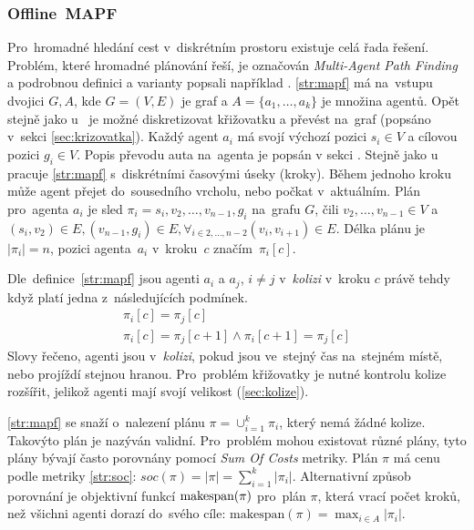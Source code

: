 \subsubsection{Offline~MAPF}\label{subsubsec:offline_mapf}

%

Pro~hromadné hledání cest v~diskrétním prostoru existuje celá řada řešení.
Problém, které hromadné plánování řeší, je označován \emph{Multi-Agent Path Finding} 
a podrobnou definici a varianty popsali například \citet{osti_10114869}.
\ref{str:mapf} má na~vstupu dvojici $G, A$, kde $G=(V, E)$ je graf a $A = \{a_1, \dots, a_k\}$ je množina agentů.
Opět stejně jako u~ je možné diskretizovat křižovatku
a převést na~graf (popsáno v~sekci \ref{sec:krizovatka}).
Každý agent $a_i$ má svojí výchozí pozici $s_i \in V$ a cílovou pozici $g_i \in V$.
Popis převodu auta na~agenta je popsán v sekci .
Stejně jako u~ pracuje \ref{str:mapf} s~diskrétními časovými úseky (kroky).
Během jednoho kroku může agent přejet do~sousedního vrcholu, nebo počkat v~aktuálním.
Plán pro~agenta $a_i$ je sled $\pi_i = s_i, v_2, \dots, v_{n-1}, g_i$ na~grafu $G$, čili $v_2, \dots, v_{n-1} \in V$ a
$(s_i, v_2) \in E, (v_{n-1}, g_i) \in E, \forall_{i \in 2, \dots, n-2} (v_i, v_{i+1}) \in E$.
Délka plánu je $|\pi_i| = n$, pozici agenta~$a_i$ v~kroku~$c$ značím~$\pi_i[c]$.

Dle~definice~\ref{str:mapf} jsou agenti $a_i$ a $a_j$, $i \neq j$ v~\emph{kolizi} v~kroku $c$
právě tehdy když platí jedna z~následujících podmínek.
\begin{gather}
	\pi_i[c] = \pi_j[c] \label{eq:mapf_kolize_vrchol}\\
	\pi_i[c] = \pi_j[c + 1] \land \pi_i[c + 1] = \pi_j[c] \label{eq:mapf_kolize_hrana}
\end{gather}
Slovy řečeno, agenti jsou v~\emph{kolizi}, pokud jsou ve~stejný čas na~stejném místě, nebo projíždí stejnou hranou.
Pro~problém křižovatky je nutné kontrolu kolize rozšířit, jelikož agenti mají svojí velikost (\ref{sec:kolize}).

\ref{str:mapf} se snaží o~nalezení plánu $\pi = \cup_{i=1}^{k} \pi_i$, který nemá žádné kolize.
Takovýto plán je nazýván validní.
Pro~problém mohou existovat různé plány, tyto plány bývají často porovnány pomocí \emph{Sum Of Costs}  metriky.
Plán $\pi$ má cenu podle metriky \ref{str:soc}: $soc(\pi) = |\pi| = \sum_{i=1}^{k} |\pi_i|$.
Alternativní způsob porovnání je objektivní funkcí $\textrm{makespan}\labeltext{makespan}{str:makespan}(\pi)$ pro~plán $\pi$,
která vrací počet kroků, než všichni agenti dorazí do~svého cíle: $\textrm{makespan}(\pi)=\max_{i\in A} |\pi_i|$.

